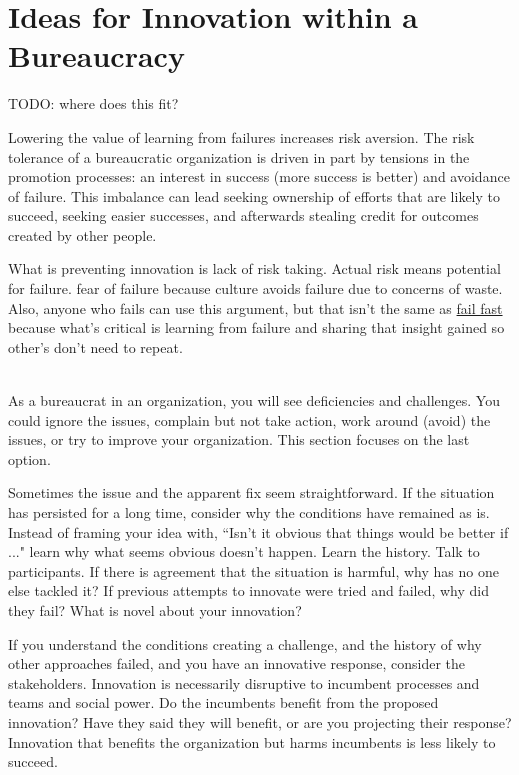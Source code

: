 \section{Ideas for Innovation within a Bureaucracy\label{sec:innovation}}

TODO: where does this fit?

Lowering the value of learning from failures increases risk aversion. The risk tolerance of a bureaucratic organization is driven in part by tensions in the promotion processes: an interest in success (more success is better) and avoidance of failure. This imbalance can lead seeking ownership of efforts that are likely to succeed, seeking easier successes, and afterwards stealing credit for outcomes created by other people. 

What is preventing innovation is lack of risk taking. Actual risk means potential for failure. fear of failure because culture avoids failure due to concerns of waste. Also, anyone who fails can use this argument, but that isn't the same as \href{https://en.wikipedia.org/wiki/Fail-fast#Business}{fail fast}\iftoggle{WPinmargin}{\marginpar{[Wikipedia] Fail fast}}{}
because what's critical is learning from failure and sharing that insight gained so other's don't need to repeat. 


\ \\

As a bureaucrat in an organization, you will see deficiencies and challenges. You could ignore the issues, complain but not take action, work around (avoid) the issues, or try to improve your organization. This section focuses on the last option.

Sometimes the issue and the apparent fix seem straightforward. If the situation has persisted for a long time, consider why the conditions have remained as is. 
Instead of framing your idea with, ``Isn't it obvious that things would be better if ..." learn why what seems obvious doesn't happen. 
Learn the history. Talk to participants. If there is agreement that the situation is harmful, why has no one else tackled it? If previous attempts to innovate were tried and failed, why did they fail? What is novel about your innovation?

If you understand the conditions creating a challenge, and the history of why other approaches failed, and you have an innovative response, consider the stakeholders. 
Innovation is necessarily disruptive to incumbent processes and teams and social power. 
Do the incumbents benefit from the proposed innovation? Have they said they will benefit, or are you projecting their response? 
Innovation that benefits the organization but harms incumbents is less likely to succeed. 

